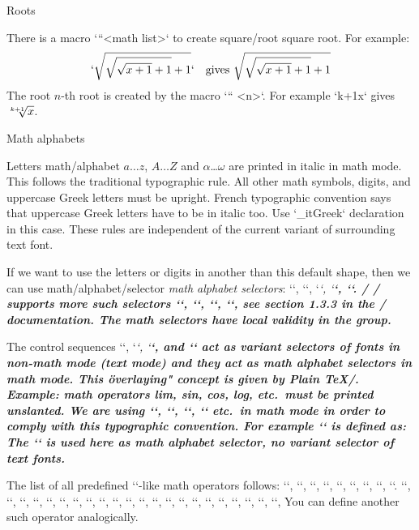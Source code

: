 \secc Roots

There is a macro \x`\sqrt``{<math list>}` to create \ii square/root square root. For example:
$$
  `\sqrt{\sqrt{\sqrt{x+1}+1}+1}` \quad \hbox{gives }
   \sqrt{\sqrt{\sqrt{x+1}+1}+1}
$$
The \ii root $n$-th root is created by the macro \x`\root`` <n>`. For
example `\root k+1\of x` gives $\root k+1\of x$.

\secc Math alphabets

Letters \ii math/alphabet $a\dots z$, $A\dots Z$ and $\alpha$\dots$\omega$ are printed in italic
in math mode. This follows the traditional typographic rule.
All other math symbols, digits, and uppercase Greek letters must be
upright.\fnote
{French typographic convention says that uppercase Greek letters have to be
 in italic too. Use `\_itGreek` declaration in this case.}
These rules are independent of the current variant of surrounding text font.

If we want to use the letters or digits
in another than this default shape, then we can use
\ii math/alphabet/selector {\em math alphabet selectors}:
\x`\mit`, \x`\rm`, \x`\it`, \x`\bf`, \x`\cal`.
\new \OpTeX/
\OpTeX/ supports more such selectors \x`\script`, \x`\frak`, \x`\bbchar`, \x`\bi`, see
section 1.3.3 in the \OpTeX/ documentation. The math selectors have local
validity in the group.

The control sequences \x`\rm`, \x`\it`, \x`\bf`, and \x`\bi` act as variant selectors
of fonts in non-math mode (text mode) and they act
as math alphabet selectors in math mode. This \"overlaying" concept
is given by Plain \TeX/. Example: math operators lim, sin, cos,
log, etc.\ must be printed unslanted. We are using `\lim`, `\sin`, `\cos`,
`\log` etc.\ in math mode in order to comply with this typographic convention. For
example `\sin` is defined as:
\begtt
\def\sin {\mathop{\rm sin}\nolimits}
\endtt
The `\rm` is used here as math alphabet selector, no variant selector of
text fonts.

The list of all predefined `\rm`-like math operators follows: \x`\arccos`,
\x`\arcsin`, \x`\arctan`, \x`\arg`, \x`\cos`, \x`\cosh`, \x`\cot`, \x`\coth`, \x`\deg`.
\x`\det`, \x`\dim`, \x`\exp`, \x`\gcd`, \x`\hom`, \x`\inf`, \x`\ker`, \x`\lg`, \x`\lim`,
\x`\liminf`, \x`\limsup`, \x`\ln`, \x`\log`, \x`\max`, \x`\min`, \x`\Pr`, \x`\scs`, \x`\sin`,
\x`\sinh`, \x`\sup`, \x`\tan`, \x`\tanh`, You can define another such operator
analogically.

